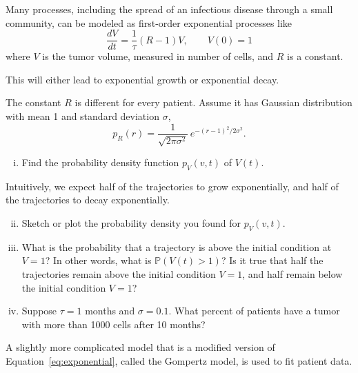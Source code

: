 \documentclass[12pt,letterpaper]{article}
\begin{document}



Many processes, including the spread of an infectious disease through a small community, can be modeled as first-order exponential processes like
\begin{equation}
\frac{dV}{dt} = \frac{1}{\tau}\left(R-1\right) V, \qquad V(0)=1 \label{eq:exponential}
\end{equation}
where $V$ is the tumor volume, measured in number of cells, and $R$ is a constant.

This will either lead to exponential growth or exponential decay.

The constant $R$ is different for every patient.
Assume it has Gaussian distribution with mean 1 and standard deviation $\sigma$,
\begin{equation*}
p_R(r) = \frac{1}{\sqrt{2\pi \sigma^2}}\, e^{-\left(r-1\right)^2/2\sigma^2}.
\end{equation*}

\begin{enumerate}[i. ]
\item Find the probability density function $p_V(v,t)$ of $V(t)$.
\end{enumerate}

Intuitively, we expect half of the trajectories to grow exponentially, and half of the trajectories to decay exponentially.

\begin{enumerate}[i. ]
\setcounter{enumi}{1}
\item Sketch or plot the probability density you found for $p_V(v,t)$.
\item What is the probability that a trajectory is above the initial condition at $V=1$? In other words, what is $\mathbb{P}(V(t)>1)$? 
Is it true that half the trajectories remain above the initial condition $V=1$, and half remain below the initial condition $V=1$? 
\item Suppose $\tau= 1$ months and $\sigma = 0.1$. What percent of patients have a tumor with more than 1000 cells after 10 months?
\end{enumerate}

A slightly more complicated model that is a modified version of Equation~\ref{eq:exponential}, called the Gompertz model, is used to fit patient data. 

\end{document}
